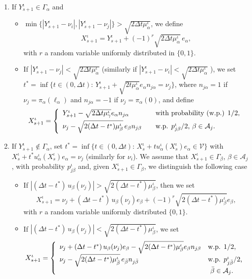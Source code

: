 \documentclass[smallextended,referee,envcountsect,]{svjour3}
\newcommand{\cA}{{\mathcal A}}
\newcommand{\cV}{{\mathcal V}}
\begin{document}
\begin{enumerate}
	\item
	If $Y^\iota_{s+1}\in\Gamma_\alpha$ and 
	\begin{itemize}
	\item[i)]   $\min\{|Y^\iota_{s+1}-\nu_i|,|Y^\iota_{s+1}-\nu_j|\} > \sqrt{2\Delta t \mu^\iota_\alpha}$, we define 
	$$ X^\iota_{s+1}=Y^\iota_{s+1}+(-1)^r \sqrt{2\Delta t \mu^\iota_\alpha}\,e_\alpha,$$
	with $r$ a random variable uniformly distributed in $\{0,1\}$.
	\item[ii)] If $|Y^\iota_{s+1}-\nu_j|< \sqrt{2\Delta t \mu^\iota_\alpha}$ (similarly if $|Y^\iota_{s+1}-\nu_i|< \sqrt{2\Delta t \mu^\iota_\alpha}$ ), we set $t^*=\inf\{t\in (0,\Delta t):\,Y^\iota_{s+1}+\sqrt{2t \mu^\iota_\alpha}e_\alpha n_{j\alpha}=\nu_j \}$, where	 $n_{j\alpha}=1$ if  $\nu_j =\pi_{\alpha} (\ell_\alpha)$ 
	and $n_{j\alpha}=-1$ if $\nu_j =    \pi_{\alpha} (0)$, and define
	$$
	 X^\iota_{s+1}=
	 \left\{ 
	 \begin{array}{ll}
	 	Y^\iota_{s+1}-\sqrt{2\Delta t \mu^\iota_\gamma}e_\alpha n_{j\alpha}& \hbox{with probability (w.p.) $1/2$},\\[4pt]
	 	\nu_j-\sqrt{2(\Delta t -t^*) \mu^\iota_\beta}\,e_\beta n_{j\beta}\quad &\hbox{w.p. $p^\iota_{j\beta}/2$, $\beta\in \cA_j$}.
	 \end{array}
	 \right.
	 	$$
	\end{itemize}
	\item
	If $Y^\iota_{s+1}\not\in\Gamma_\alpha$, set  $t^*=\inf\{t\in (0,\Delta t):\,X^\iota_s+t u^\iota_\alpha(X^\iota_s)e_\alpha\in\cV\}$ with $X^\iota_s+t^* u^\iota_\alpha(X^\iota_s)e_\alpha=\nu_j$ (similarly for $\nu_i$). We  assume that $X^\iota_{s+1}\in \Gamma_\beta$, $\beta \in \cA_j$, with probability $p^\iota_{j\beta}$ and, given $X^\iota_{s+1}\in \Gamma_\beta$,  we distinguish the following case
	\begin{itemize}
		\item[i)]  If $|(\Delta t-t^*) \, u_\beta(\nu_j)| > \sqrt{2(\Delta t-t^*) \mu^\iota_\beta}$, then we set
		$$ X^\iota_{s+1}= \nu_j+ (\Delta t-t^*)\, u_\beta(\nu_j)e_\beta+(-1)^r \sqrt{2(\Delta t-t^*) \mu^\iota_\beta}e_\beta, $$
		with $r$ a random variable uniformly distributed $\{0,1\}$.
		\item[ii)] If $|(\Delta t-t^*) \, u_\beta(\nu_j)| < \sqrt{2(\Delta t-t^*) \mu^\iota_\beta}$, we set 
		$$
		X^\iota_{s+1}=
		\left\{ 
		\begin{array}{ll}
			\nu_j+ (\Delta t-t^*)\, u_\beta(\nu_j)e_\beta-\sqrt{2(\Delta t-t^*) \mu^\iota_\beta}e_\beta n_{j\beta}& \hbox{w.p. $1/2$},\\[4pt]
			\nu_j-\sqrt{2(\Delta t -t^*) \mu^\iota_{\bar\beta}}\,e_{\bar\beta} n_{j{\bar\beta}} &\hbox{w.p. $p^\iota_{j{\bar\beta}}/2$,}\\
			& \hbox{ ${\bar\beta}\in \cA_j$}.
		\end{array}
		\right.
		$$
	\end{itemize}
\end{enumerate}
\end{document}
